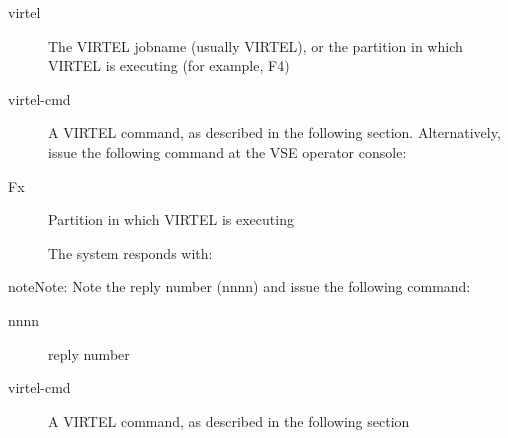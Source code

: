\documentclass[letterpaper,10pt,english]{sphinxmanual}
\begin{document}
\begin{sphinxVerbatim}[commandchars=\\\{\}]
 
\end{sphinxVerbatim}
\begin{description}
\item[{virtel}] \leavevmode
The VIRTEL jobname (usually VIRTEL), or the partition in which VIRTEL is executing (for example, F4)

\item[{virtel-cmd}] \leavevmode
A VIRTEL command, as described in the following section. Alternatively, issue the following command at the VSE operator console:

\end{description}

\begin{sphinxVerbatim}[commandchars=\\\{\}]
 
\end{sphinxVerbatim}
\begin{description}
\item[{Fx}] \leavevmode
Partition in which VIRTEL is executing

The system responds with:

\end{description}

\begin{sphinxVerbatim}[commandchars=\\\{\}]
   
 
\end{sphinxVerbatim}

\begin{sphinxadmonition}{note}{Note:}
Note the reply number (nnnn) and issue the following command:
\end{sphinxadmonition}

\begin{sphinxVerbatim}[commandchars=\\\{\}]
 
\end{sphinxVerbatim}
\begin{description}
\item[{nnnn}] \leavevmode
reply number

\item[{virtel-cmd}] \leavevmode
A VIRTEL command, as described in the following section

\end{description}
\end{document}
